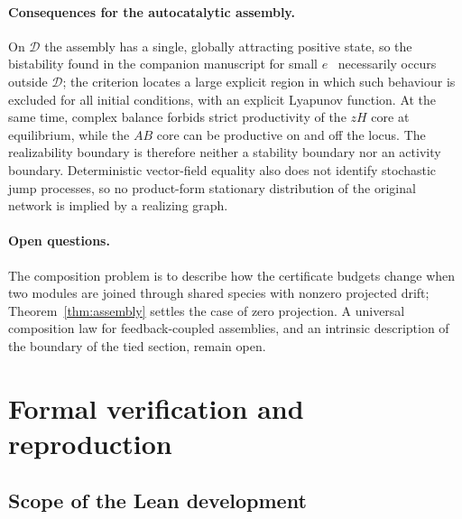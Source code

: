 \documentclass[11pt,a4paper]{article}
\theoremstyle{plain}
\theoremstyle{definition}
\theoremstyle{remark}
\newcommand{\DT}{\mathcal{D}}
\begin{document}
\paragraph{Consequences for the autocatalytic assembly.} On $\DT$ the assembly has a single, globally attracting positive state, so the bistability found in the companion manuscript for small $e$~\cite{FeedbackBistability2026} necessarily occurs outside $\DT$; the criterion locates a large explicit region in which such behaviour is excluded for all initial conditions, with an explicit Lyapunov function. At the same time, complex balance forbids strict productivity of the $zH$ core at equilibrium, while the $AB$ core can be productive on and off the locus. The realizability boundary is therefore neither a stability boundary nor an activity boundary. Deterministic vector-field equality also does not identify stochastic jump processes, so no product-form stationary distribution of the original network is implied by a realizing graph.

\paragraph{Open questions.} The composition problem is to describe how the certificate budgets change when two modules are joined through shared species with nonzero projected drift; Theorem~\ref{thm:assembly} settles the case of zero projection. A universal composition law for feedback-coupled assemblies, and an intrinsic description of the boundary of the tied section, remain open.

\appendix
\section{Formal verification and reproduction}\label{app:formal}

\subsection{Scope of the Lean development}
\end{document}

